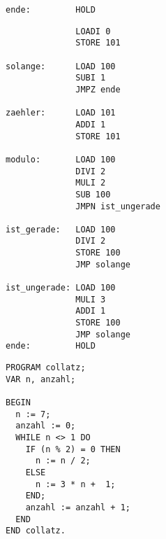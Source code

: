 \documentclass{lehramt-informatik-aufgabe}
\begin{document}
\begin{enumerate}
\begin{verbatim}
ende:         HOLD
\end{verbatim}

\begin{verbatim}
              LOADI 0
              STORE 101

solange:      LOAD 100
              SUBI 1
              JMPZ ende

zaehler:      LOAD 101
              ADDI 1
              STORE 101

modulo:       LOAD 100
              DIVI 2
              MULI 2
              SUB 100
              JMPN ist_ungerade

ist_gerade:   LOAD 100
              DIVI 2
              STORE 100
              JMP solange

ist_ungerade: LOAD 100
              MULI 3
              ADDI 1
              STORE 100
              JMP solange
ende:         HOLD
\end{verbatim}

\begin{verbatim}
PROGRAM collatz;
VAR n, anzahl;

BEGIN
  n := 7;
  anzahl := 0;
  WHILE n <> 1 DO
    IF (n % 2) = 0 THEN
      n := n / 2;
    ELSE
      n := 3 * n +  1;
    END;
    anzahl := anzahl + 1;
  END
END collatz.
\end{verbatim}
\end{enumerate}
\end{document}
